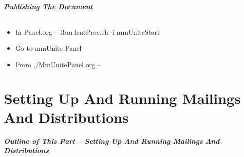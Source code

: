 \begin{frame}[fragile,label=PublishingTheDocument]
    \frametitle{Publishing The Document}
    \framesubtitle{}

\begin{itemize}
\item In Panel.org -- Run  lcntProc.sh -i mmUniteStart 
\item Go to mmUnite Panel
\item From ./MmUnitePanel.org -- 
\end{itemize}



\end{frame}


\begin{comment}
*      ================
*  [[elisp:(org-cycle)][| ]] [[elisp:(org-show-subtree)][|=]] [[elisp:(show-children 10)][|V]] [[elisp:(bx:orgm:indirectBufOther)][|>]] [[elisp:(bx:orgm:indirectBufMain)][|I]] [[elisp:(blee:ppmm:org-mode-toggle)][|N]] [[elisp:(org-top-overview)][|O]] [[elisp:(progn (org-shifttab) (org-content))][|C]] [[elisp:(delete-other-windows)][|1]]  *Part 0*   /Setting Up And Running Mailings And Distributions/ ::  [[elisp:(org-cycle)][| ]]
\end{comment}

\newpage
\part{Setting Up And Running Mailings And Distributions}
\label{part:SettingUpAndRunningMailingsAndDistributions}

\begin{latexonly}
\begin{presentationMode}
\begin{frame}[fragile,plain,label=Part0]
\frametitle{Outline of This Part -- Setting Up And Running Mailings And Distributions}
\tableofcontents[sectionstyle=show,subsectionstyle=show]
\end{frame}
\end{presentationMode}
\end{latexonly}


